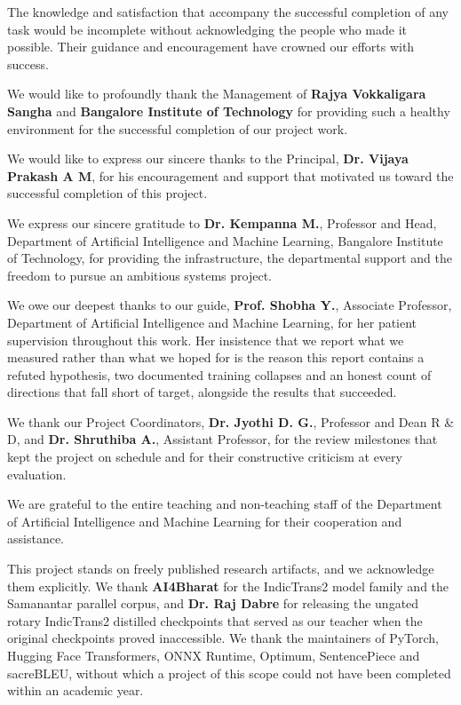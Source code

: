 \thispagestyle{frontblank}

{\fontsize{12}{19}\selectfont
{}
\setlength{\parindent}{0.5in}

The knowledge and satisfaction that accompany the successful completion of any
task would be incomplete without acknowledging the people who made it possible.
Their guidance and encouragement have crowned our efforts with success.

We would like to profoundly thank the Management of \textbf{Rajya Vokkaligara
Sangha} and \textbf{Bangalore Institute of Technology} for providing such a
healthy environment for the successful completion of our project work.

We would like to express our sincere thanks to the Principal,
\textbf{Dr. Vijaya Prakash A M}, for his encouragement and support that
motivated us toward the successful completion of this project.

We express our sincere gratitude to \textbf{Dr. Kempanna M.}, Professor and Head,
Department of Artificial Intelligence and Machine Learning, Bangalore Institute
of Technology, for providing the infrastructure, the departmental support and
the freedom to pursue an ambitious systems project.

We owe our deepest thanks to our guide, \textbf{Prof. Shobha Y.}, Associate
Professor, Department of Artificial Intelligence and Machine Learning, for her
patient supervision throughout this work. Her insistence that we report what we
measured rather than what we hoped for is the reason this report contains a
refuted hypothesis, two documented training collapses and an honest count of
directions that fall short of target, alongside the results that succeeded.

We thank our Project Coordinators, \textbf{Dr. Jyothi D. G.}, Professor and
Dean R \& D, and \textbf{Dr. Shruthiba A.}, Assistant Professor, for the review
milestones that kept the project on schedule and for their constructive
criticism at every evaluation.

We are grateful to the entire teaching and non-teaching staff of the Department
of Artificial Intelligence and Machine Learning for their cooperation and
assistance.

This project stands on freely published research artifacts, and we acknowledge
them explicitly. We thank \textbf{AI4Bharat} for the IndicTrans2 model family and
the Samanantar parallel corpus, and \textbf{Dr. Raj Dabre} for releasing the
ungated rotary IndicTrans2 distilled checkpoints that served as our teacher when
the original checkpoints proved inaccessible. We thank the maintainers of
PyTorch, Hugging Face Transformers, ONNX Runtime, Optimum, SentencePiece and
sacreBLEU, without which a project of this scope could not have been completed
within an academic year.

}
